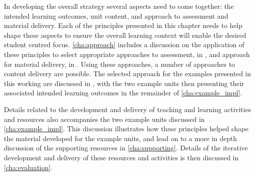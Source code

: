 In developing the overall strategy several aspects need to come together: the intended learning outcomes, unit content, and approach to assessment and material delivery. Each of the principles presented in this chapter needs to help shape these aspects to ensure the overall learning context will enable the desired student centred focus. \cref{cha:approach} includes a discussion on the application of these principles to select appropriate approaches to assessment, in , and approach for material delivery, in . Using these approaches, a number of approaches to content delivery are possible. The selected approach for the examples presented in this working are discussed in , with the two example units then presenting their associated intended learning outcomes in the remainder of \cref{cha:example_impl}.

Details related to the development and delivery of teaching and learning activities and resources also accompanies the two example units discussed in \cref{cha:example_impl}. This discussion illustrates how these principles helped shape the material developed for the example units, and lead on to a more in depth discussion of the supporting resources in \cref{cha:supporting}. Details of the iterative development and delivery of these resources and activities is then discussed in \cref{cha:evaluation}.







